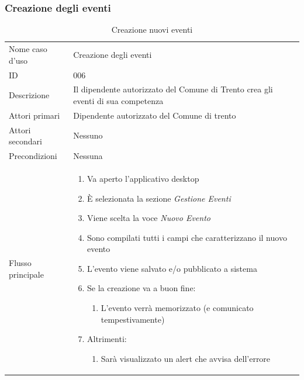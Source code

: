 \documentclass{article}
\begin{document}
\clearpage

\subsubsection{Creazione degli eventi}

\begin{table}[htbp]
    \centering
    \begin{tabularx}{\textwidth}{| l | p{} |}
        \Xhline{2pt} %
        Nome caso d'uso & Creazione degli eventi \\
        \Xhline{2pt} %
        ID & 006 \\
        \hline
        Descrizione & Il dipendente autorizzato del Comune di Trento crea gli eventi di sua competenza\\
        \hline
        Attori primari & Dipendente autorizzato del Comune di trento\\
        \hline
        Attori secondari & Nessuno \\
        \hline
        Precondizioni & Nessuna \\
        \hline
        Flusso principale & 
        \begin{enumerate}[topsep=5pt,partopsep=0pt,parsep=0pt,itemsep=0pt,before=\vspace{-\baselineskip},after=\vspace{-\baselineskip}]                
            \item Va aperto l'applicativo desktop
            \item È selezionata la sezione \textit{Gestione Eventi}
            \item Viene scelta la voce \textit{Nuovo Evento}
            \item Sono compilati tutti i campi che caratterizzano il nuovo evento
            \item L'evento viene salvato e/o pubblicato a sistema
            \item Se la creazione va a buon fine:
            \begin{enumerate}[leftmargin=*, nosep]
                \item L'evento verrà memorizzato (e comunicato tempestivamente)
            \end{enumerate}
            \item Altrimenti:
            \begin{enumerate}[leftmargin=*, nosep]
                \item Sarà visualizzato un alert che avvisa dell'errore
            \end{enumerate}
        \end{enumerate}
        \\
        \hline
    \end{tabularx}
    \caption{Creazione nuovi eventi}
    \label{tab:tabella_use_case006}
\end{table}
\end{document}
